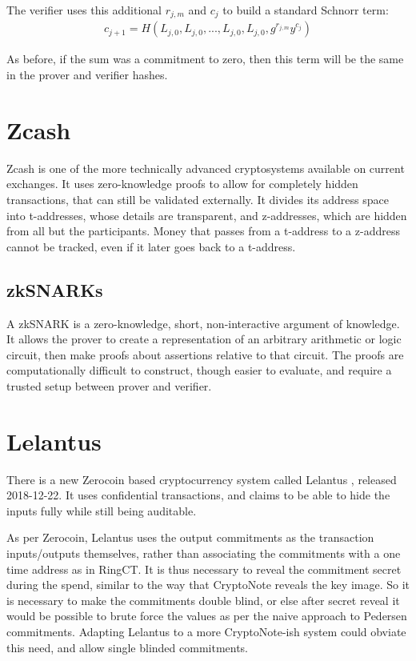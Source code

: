 \documentclass{article}
\begin{document}
The verifier uses this additional $r_{j,m}$ and $c_j$ to build a standard Schnorr term:
\begin{align}
  c_{j+1} = H(L_{j,0}, L_{j,0}, ... , L_{j,0}, L_{j,0}, g^{r_{j,m}} y^{c_j})
\end{align}

As before, if the sum was a commitment to zero, then this term will be the same in the prover and verifier hashes.



\section{Zcash}

Zcash is one of the more technically advanced cryptosystems available on current exchanges.  It uses zero-knowledge proofs to allow for completely hidden transactions, that can still be validated externally.  It divides its address space into t-addresses, whose details are transparent, and z-addresses, which are hidden from all but the participants.  Money that passes from a t-address to a z-address cannot be tracked, even if it later goes back to a t-address.


\subsection{zkSNARKs}

A zkSNARK is a zero-knowledge, short, non-interactive argument of knowledge.  It allows the prover to create a representation of an arbitrary arithmetic or logic circuit, then make proofs about assertions relative to that circuit.  The proofs are computationally difficult to construct, though easier to evaluate, and require a trusted setup between prover and verifier.



\section{Lelantus}

There is a new Zerocoin based cryptocurrency system called Lelantus \cite{lelantus}, released 2018-12-22.  It uses confidential transactions, and claims to be able to hide the inputs fully while still being auditable.  

As per Zerocoin, Lelantus uses the output commitments as the transaction inputs/outputs themselves, rather than associating the commitments with a one time address as in RingCT.  It is thus necessary to reveal the commitment secret during the spend, similar to the way that CryptoNote reveals the key image.  So it is necessary to make the commitments double blind, or else after secret reveal it would be possible to brute force the values as per the naive approach to Pedersen commitments.  Adapting Lelantus to a more CryptoNote-ish system could obviate this need, and allow single blinded commitments.
\end{document}
